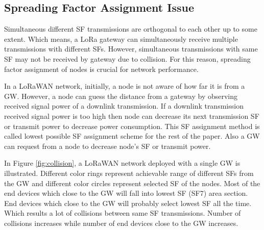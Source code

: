\documentclass[conference]{IEEEtran}
\begin{document}
\subsection{Spreading Factor Assignment Issue}
\par Simultaneous different SF transmissions are orthogonal to each other up to some extent. Which means, a LoRa gateway can simultaneously receive multiple transmissions with different SFs. However, simultaneous transmissions with same SF may not be received by gateway due to collision. For this reason, spreading factor assignment of nodes is crucial for network performance.

\par In a LoRaWAN network, initially, a node is not aware of how far it is from a GW. However, a node can guess the distance from a gateway by observing received signal power of a downlink transmission. If a downlink transmission received signal power is too high then node can decrease its next transmission SF or transmit power to decrease power consumption. This SF assignment method is called lowest possible SF assignment scheme for the rest of the paper. Also a GW can request from a node to decrease node's SF or transmit power.

\par In Figure \ref{fig:collision}, a LoRaWAN network deployed with a single GW is illustrated. Different color rings represent achievable range of different SFs from the GW and different color circles represent selected SF of the nodes. Most of the end devices which close to the GW will fall into lowest SF (SF7) area section. End devices which close to the GW will probably select lowest SF all the time. Which results a lot of collisions between same SF transmissions. Number of collisions increases while number of end devices close to the GW increases.
\end{document}
